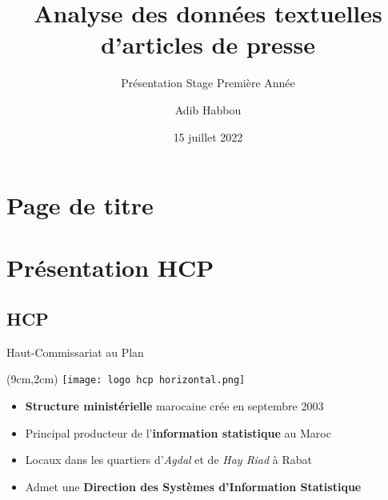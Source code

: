 \documentclass[10pt,sans,usenames,dvipsnames,english,compress]{beamer}
\title{Analyse des données textuelles d'articles de presse}
\subtitle{Présentation Stage Première Année}
\author[Adib Habbou]{Adib Habbou}
\date{15 juillet 2022}
\institute[ENSIIE]{Haut-Commissariat au Plan du Maroc}
\begin{document}
\section{Page de titre}
\begin{frame}[plain]
	\vspace{0.6cm}
	\begin{minipage}{\textwidth}
		\centering
		\hspace*{2cm}
	\end{minipage}
	\vspace{0.6cm}
	\titlepage
\end{frame}

\section{Présentation HCP}
\subsection{HCP}
\begin{frame}{Haut-Commissariat au Plan}
	\begin{textblock*}{3cm}(9cm,2cm) %
		\texttt{[image: logo hcp horizontal.png]}
	\end{textblock*}
 
        \vspace{1cm}
        
	\begin{itemize}
		\item \textbf{Structure ministérielle} marocaine crée en septembre 2003
		\item Principal producteur de l’\textbf{information statistique} au Maroc
            \item Locaux dans les quartiers d'\emph{Agdal} et de \emph{Hay Riad} à Rabat
		\item Admet une \textbf{Direction des Systèmes d’Information Statistique}
	\end{itemize}
\end{frame}
\end{document}
